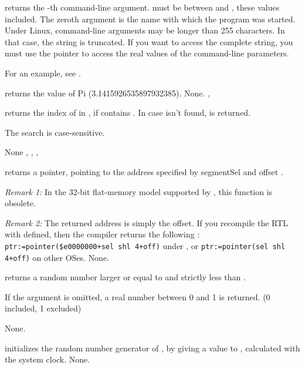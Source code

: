 \documentclass{report}
\begin{document}
{ returns the -th command-line argument.  must
be between  and , these values included.
The zeroth argument is the name with which the program was started.
}
{Under Linux, command-line arguments may be longer than 255 characters. In
that case, the string is truncated. If you want to access the complete
string, you must use the  pointer to access the real values of the
command-line parameters.}
{}

For an example, see .

{ returns the value of Pi (3.1415926535897932385).}
{None.}
{, }




{ returns the index of  in , if  contains
. In case  isn't found,  is returned.

The search is case-sensitive.
}
{None}
{, , , }




{ returns a pointer, pointing to the address specified by
segment{Sel} and offset .

{\em Remark 1:} In the 32-bit flat-memory model supported by \fpk, this
function is obsolete.}

{\em Remark 2:} The returned address is simply the offset. If you recompile
the RTL with  defined, then the compiler returns the
following : \verb|ptr:=pointer($e0000000+sel shl 4+off)| under \dos, or
\verb|ptr:=pointer(sel shl 4+off)| on other OSes.
{None.}
{}


{ returns a random number larger or equal to  and
strictly less than .

If the argument  is omitted, a real number between 0 and 1 is returned.
(0 included, 1 excluded)}
{None.}
{}




{ initializes the random number generator of \fpk, by giving
a value to , calculated with the system clock.
}
{None.}
{}
\end{document}
